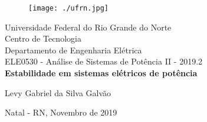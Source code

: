 \onehalfspacing
\begin{titlepage}
	\begin{center}
	
	\begin{figure}[!ht]
	\centering
	\texttt{[image: ./ufrn.jpg]}
	\end{figure}
		Universidade Federal do Rio Grande do Norte \\ Centro de Tecnologia \\ Departamento de Engenharia Elétrica \\ ELE0530 - Análise de Sistemas de Potência II - 2019.2 \\
		\vspace{15pt}
        \vspace{95pt}
        \textbf{\Large{Estabilidade em sistemas elétricos de potência}}\\
		\vspace{3,5cm}
	\end{center}
	
	\begin{flushright}
			\item  Levy Gabriel da Silva Galvão 
 	\end{flushright}
	\vspace{1cm}
	
	\begin{center}
		\vspace{\fill}
		Natal - RN, Novembro de 2019
	\end{center}
\end{titlepage}




